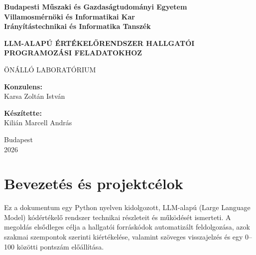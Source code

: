 \documentclass[12pt,a4paper]{article}
\begin{document}
\begin{titlepage}
    \begin{center}
        \vspace*{1cm}
        
        \Large
        \textbf{Budapesti Műszaki és Gazdaságtudományi Egyetem} \\
        \textbf{Villamosmérnöki és Informatikai Kar} \\
        \textbf{Irányítástechnikai és Informatika Tanszék}
        
        \vspace{4cm}
        
        \huge
        \textbf{LLM-ALAPÚ ÉRTÉKELŐRENDSZER HALLGATÓI PROGRAMOZÁSI FELADATOKHOZ}
        
        \vspace{1.5cm}
        
        \LARGE
        ÖNÁLLÓ LABORATÓRIUM
        
        \vfill
        
        \begin{minipage}[t]{0.45\textwidth}
            \flushleft
            \textbf{Konzulens:} \\
            Karsa Zoltán István \\
        \end{minipage}
        \hfill
        \begin{minipage}[t]{0.45\textwidth}
            \flushright
            \textbf{Készítette:} \\
            Kilián Marcell András \\
        \end{minipage}
        
        \vspace{2.5cm}
        
        \Large
        Budapest \\
        2026
        
    \end{center}
\end{titlepage}

\tableofcontents
\newpage

\section{Bevezetés és projektcélok}
\label{sec:bevezetes}
Ez a dokumentum egy Python nyelven kidolgozott, LLM-alapú (Large Language Model) kódértékelő rendszer technikai részleteit és működését ismerteti. A megoldás elsődleges célja a hallgatói forráskódok automatizált feldolgozása, azok szakmai szempontok szerinti kiértékelése, valamint szöveges visszajelzés és egy 0--100 közötti pontszám előállítása.
\end{document}
